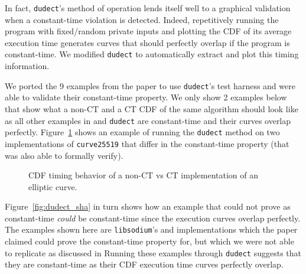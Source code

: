 In fact, \texttt{dudect}'s method of operation lends itself well to a graphical validation when a constant-time violation is detected.
Indeed, repetitively running the program with fixed/random private inputs and plotting the CDF of its average execution time generates curves that should perfectly overlap if the program is constant-time.
We modified \texttt{dudect} to automatically extract and plot this timing information.

We ported the 9 examples from the \ctVerif paper to use \texttt{dudect}'s test harness and were able to validate their constant-time property.
We only show 2 examples below that show what a non-CT and a CT CDF of the same algorithm should look like as all other examples in \ctVerif and \texttt{dudect} are constant-time and their curves overlap perfectly.
Figure~\ref{fig:dudect_donna} shows an example of running the \texttt{dudect} method on two implementations of \texttt{curve25519} that differ in the constant-time property (that \ctVerif was also able to formally verify).

\begin{figure}[h!]
  \centering
  \label{fig:dudect_donnabad}
  \label{fig:dudect_donnagood}
  \caption{CDF timing behavior of a non-CT vs CT implementation of an elliptic curve.}
  \label{fig:dudect_donna}
\end{figure}

Figure~\ref{fig:dudect_sha} in turn shows how an example that \ctVerif could not prove as constant-time \emph{could} be constant-time since the execution curves overlap perfectly.
The examples shown here are \texttt{libsodium}'s  and  implementations which the \ctVerif paper claimed could prove the constant-time property for, but which we were not able to replicate as discussed in 
Running these examples through \texttt{dudect} suggests that they are constant-time as their CDF execution time
curves perfectly overlap.

